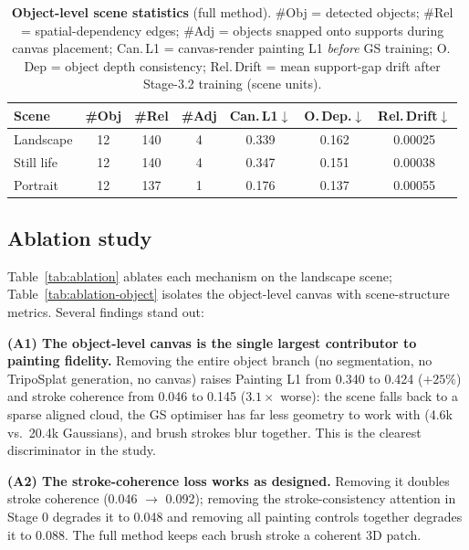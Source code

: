 \begin{table}[t]
\centering
\scriptsize
\setlength{\tabcolsep}{3pt}
\begin{tabular*}{\linewidth}{@{\extracolsep{\fill}}lcccccc}
\toprule
Scene & \#Obj & \#Rel & \#Adj & Can.\,L1$\downarrow$ & O.\,Dep.$\downarrow$ & Rel.\,Drift$\downarrow$ \\
\midrule
Landscape   & 12 & 140 & 4 & 0.339 & 0.162 & 0.00025 \\
Still life  & 12 & 140 & 4 & 0.347 & 0.151 & 0.00038 \\
Portrait    & 12 & 137 & 1 & 0.176 & 0.137 & 0.00055 \\
\bottomrule
\end{tabular*}
\caption{\textbf{Object-level scene statistics} (full method). \#Obj =
detected objects; \#Rel = spatial-dependency edges; \#Adj = objects snapped
onto supports during canvas placement; Can.\,L1 = canvas-render painting L1
\emph{before} GS training; O.\,Dep = object depth consistency; Rel.\,Drift
= mean support-gap drift after Stage-3.2 training (scene units).}
\label{tab:object-main}
\end{table}

\subsection{Ablation study}
\label{sec:exp-ablation}

Table~\ref{tab:ablation} ablates each mechanism on the landscape scene;
Table~\ref{tab:ablation-object} isolates the object-level canvas with
scene-structure metrics. Several findings stand out:

\textbf{(A1) The object-level canvas is the single largest contributor to
painting fidelity.} Removing the entire object branch (no segmentation, no
TripoSplat generation, no canvas) raises Painting L1 from 0.340 to 0.424
($+25\%$) and stroke coherence from 0.046 to 0.145 ($3.1\times$ worse): the
scene falls back to a sparse aligned cloud, the GS optimiser has far less
geometry to work with (4.6k vs.\ 20.4k Gaussians), and brush strokes blur
together. This is the clearest discriminator in the study.

\textbf{(A2) The stroke-coherence loss works as designed.} Removing it
doubles stroke coherence (0.046 $\to$ 0.092); removing the
stroke-consistency attention in Stage 0 degrades it to 0.048 and removing
all painting controls together degrades it to 0.088. The full method keeps
each brush stroke a coherent 3D patch.

